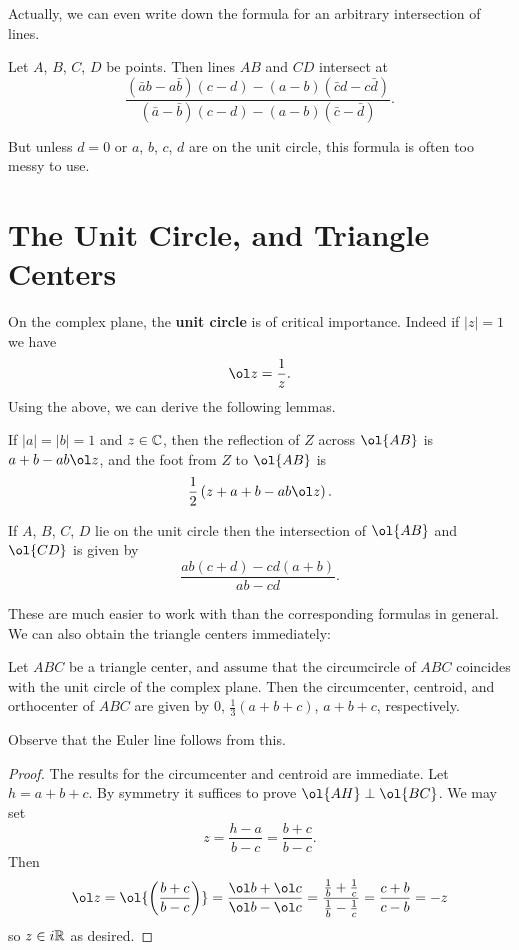 \documentclass[11pt]{scrartcl}
\begin{document}
Actually, we can even write down the formula for an arbitrary intersection of lines.
\begin{proposition}
  \label{prop:complex_intersect}
  Let $A$, $B$, $C$, $D$ be points. Then lines $AB$ and $CD$ intersect at
  \[ \frac{ (\bar a b - a \bar b )(c-d) - (a-b)(\bar c d - c \bar d) }{(\bar a - \bar b )(c-d) - (a-b)(\bar c - \bar d)}. \]
\end{proposition}
But unless $d=0$ or $a$, $b$, $c$, $d$ are on the unit circle, this formula is often too messy to use.


\section{The Unit Circle, and Triangle Centers}
\label{sec:unitcircle}
On the complex plane, the \textbf{unit circle} is of critical importance.
Indeed if $\left\lvert z \right\rvert = 1$ we have \[ \ol z = \frac 1z. \]
Using the above, we can derive the following lemmas.

\begin{lemma}
  If $ \left\lvert a \right\rvert = \left\lvert b \right\rvert = 1$ and $z \in \mathbb C$,
  then the reflection of $Z$ across $\ol{AB}$ is
  $a+b-ab \ol z$,
  and the foot from $Z$ to $\ol{AB}$ is
  \[ \half \left( z+a+b -ab \ol z \right). \]
\end{lemma}
\begin{lemma}
  If $A$, $B$, $C$, $D$ lie on the unit circle then
  the intersection of $\ol{AB}$ and $\ol{CD}$ is given by
  \[ \frac{ab(c+d)-cd(a+b)}{ab-cd}. \]
\end{lemma}

These are much easier to work with than the corresponding formulas in general.
We can also obtain the triangle centers immediately:
\begin{theorem}
  Let $ABC$ be a triangle center, and assume that the circumcircle of
  $ABC$ coincides with the unit circle of the complex plane.
  Then the circumcenter, centroid, and orthocenter of $ABC$
  are given by $0$, $\frac 13 (a+b+c)$, $a+b+c$, respectively.
\end{theorem}
Observe that the Euler line follows from this.

\begin{proof}
  The results for the circumcenter and centroid are immediate.
  Let $h = a+b+c$.
  By symmetry it suffices to prove $\ol{AH} \perp \ol{BC}$.
  We may set
  \[ z  = \frac{h-a}{b-c} = \frac{b+c}{b-c}. \]
  Then
  \[ \ol z = \ol{\left( \frac{b+c}{b-c} \right)}
    = \frac{\ol b + \ol c}{\ol b - \ol c}
    = \frac{\frac 1b + \frac 1c}{\frac 1b - \frac 1c}
    = \frac{c+b}{c-b} = -z \]
  so $z \in i \mathbb R$ as desired.
\end{proof}
\end{document}
